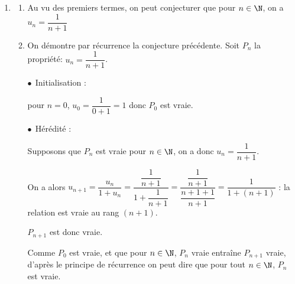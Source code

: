 \begin{enumerate}
La fonction $f$ est continue, car dérivable sur $\R^+$, donc la limite $\ell$ vérifie  l'égalité $f(\ell) = \ell$.

On résout l'équation: $\dfrac{\ell}{1+\ell}= \ell \iff \ell = \ell(1 + \ell) \iff 0= \ell ^2 \iff \ell = 0$.

Donc la suite $(u_n)$ a pour limite 0.

\item 
	\begin{enumerate}
		\item %
Au vu des premiers termes, on peut conjecturer que pour $n \in \N$, on a $u_n = \dfrac{1}{n+1}$
				
		\item On démontre par récurrence la conjecture précédente.
Soit $P_n$ la propriété: $u_n=\dfrac{1}{n+1}$.
		
$\bullet~~$Initialisation :
		
pour $n=0$, $u_0=\dfrac{1}{0+1}=1$ donc $P_0$ est vraie.

$\bullet~~$Hérédité : 
		
Supposons que $P_n$ est vraie pour $n \in \N$, on a donc $u_n=\dfrac{1}{n+1}$.
		
On a alors $u_{n+1}=\dfrac{u_n}{1+u_n}=\dfrac{\dfrac{1}{n+1}}{1+\dfrac{1}{n+1}}=\dfrac{\dfrac{1}{n+1}}{\dfrac{n+1+1}{n+1}}=\dfrac{1}{1+(n+1)}$ : la relation est vraie au rang $(n + 1)$.

$P_{n+1}$ est donc vraie.
		
Comme $P_0$ est vraie, et que pour $n \in \N$,\: $P_n$ vraie entraîne $P_{n+1}$ vraie, d'après le principe de récurrence  on peut dire que pour tout $n \in \N$, $P_n$ est vraie.
	\end{enumerate}
\end{enumerate}

\vspace{1cm}


